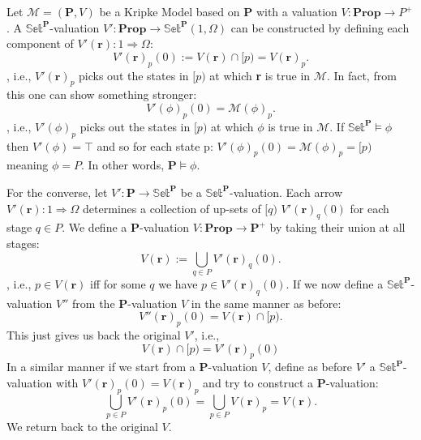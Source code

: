 \begin{remark}
	Let $\mathcal{M}=(\textbf{P},V)$ be a Kripke Model based on $\textbf{P}$ with a valuation $V: \textbf{Prop} \rightarrow P^+$. \newline
	A $\mathbb{Set}^\textbf{P}$-valuation $V': \textbf{Prop} \rightarrow \mathbb{Set}^\textbf{P}(1,\Omega)$ can be constructed by defining each component of $V'(\textbf{r}): 1 \Rightarrow \Omega$:
	\begin{equation*}
		V'(\textbf{r})_p(0) := V(\textbf{r}) \cap [p) = V(\textbf{r})_p.
	\end{equation*}
	, i.e., $V'(\textbf{r})_p$ picks out the states in $[p)$ at which \textbf{r} is true in $\mathcal{M}$.\newline
	In fact, from this one can show something stronger:
	\begin{equation*}
		V'(\phi)_p(0) = \mathcal{M}(\phi)_p.
	\end{equation*}
	, i.e., $V'(\phi)_p$ picks out the states in $[p)$ at which $\phi$ is true in $\mathcal{M}$.\newline
	If $\mathbb{Set}^\textbf{P} \models \phi$ then $V'(\phi)=\top$ and so for each state p: $V'(\phi)_p(0) = \mathcal{M}(\phi)_p = [p) $ meaning $\mathcal{\phi}=P$. In other words, $\textbf{P} \models \phi$.   
\end{remark}

\begin{remark}
	For the converse, let $V' : \textbf{P} \rightarrow \mathbb{Set}^\textbf{P}$ be a  $\mathbb{Set}^\textbf{P}$-valuation. \newline
	Each arrow $V'(\textbf{r}) : 1 \Rightarrow \Omega$ determines a collection of up-sets of $[q)$ $V'(\textbf{r})_q(0)$ for each stage $q \in P$.\newline
	We define a \textbf{P}-valuation $V: \textbf{Prop} \rightarrow \textbf{P}^+$ by taking their union at all stages:
	\begin{equation*}
		V(\textbf{r}) := \bigcup_{q \in P} V'(\textbf{r})_q(0).
	\end{equation*} 
	, i.e., $p \in V(\textbf{r})$ iff for some $q$ we have $p \in V'(\textbf{r})_q(0)$.\newline
	If we now define a $\mathbb{Set}^\textbf{P}$-valuation $V''$ from the $\textbf{P}$-valuation $V$ in the same manner as before:
	\begin{equation*}
		V''(\textbf{r})_p(0) = V(\textbf{r}) \cap [p).
	\end{equation*} 
	This just gives us back the original $V'$, i.e.,
	\begin{equation*}
		V(\textbf{r}) \cap [p) = V'(\textbf{r})_p(0)
	\end{equation*}
	In a similar manner if we start from a \textbf{P}-valuation $V$, define as before $V'$ a $\mathbb{Set}^\textbf{P}$-valuation with $V'(\textbf{r})_p(0)=V(\textbf{r})_p$ and try to construct a \textbf{P}-valuation:
	\begin{equation*}
		\bigcup_{p \in P} V'(\textbf{r})_p(0) = \bigcup_{p \in P} V(\textbf{r})_p = V(\textbf{r}). 
	\end{equation*}  
	We return back to the original $V$.
\end{remark}

